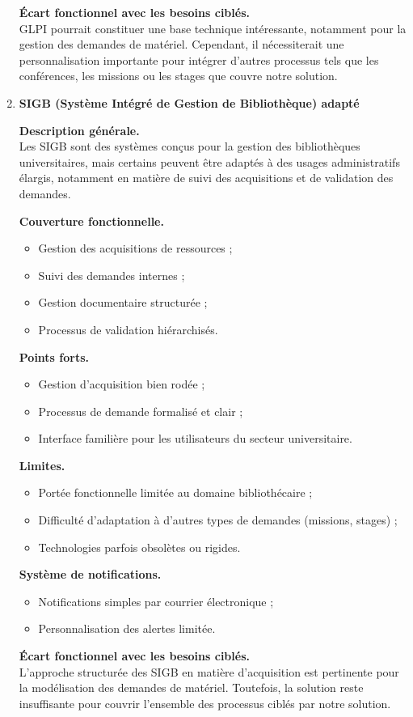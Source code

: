 \begin{enumerate}[label=\alph*)]
\textbf{Écart fonctionnel avec les besoins ciblés.} \\
GLPI pourrait constituer une base technique intéressante, notamment pour la gestion des demandes de matériel. Cependant, il nécessiterait une personnalisation importante pour intégrer d'autres processus tels que les conférences, les missions ou les stages que couvre notre solution.

\item \textbf{SIGB (Système Intégré de Gestion de Bibliothèque) adapté}

\textbf{Description générale.} \\
Les SIGB sont des systèmes conçus pour la gestion des bibliothèques universitaires, mais certains peuvent être adaptés à des usages administratifs élargis, notamment en matière de suivi des acquisitions et de validation des demandes.

\textbf{Couverture fonctionnelle.}
\begin{itemize}
\item Gestion des acquisitions de ressources ;
\item Suivi des demandes internes ;
\item Gestion documentaire structurée ;
\item Processus de validation hiérarchisés.
\end{itemize}

\textbf{Points forts.}
\begin{itemize}
\item Gestion d'acquisition bien rodée ;
\item Processus de demande formalisé et clair ;
\item Interface familière pour les utilisateurs du secteur universitaire.
\end{itemize}

\textbf{Limites.}
\begin{itemize}
\item Portée fonctionnelle limitée au domaine bibliothécaire ;
\item Difficulté d'adaptation à d'autres types de demandes (missions, stages) ;
\item Technologies parfois obsolètes ou rigides.
\end{itemize}

\textbf{Système de notifications.}
\begin{itemize}
\item Notifications simples par courrier électronique ;
\item Personnalisation des alertes limitée.
\end{itemize}

\textbf{Écart fonctionnel avec les besoins ciblés.} \\
L'approche structurée des SIGB en matière d'acquisition est pertinente pour la modélisation des demandes de matériel. Toutefois, la solution reste insuffisante pour couvrir l'ensemble des processus ciblés par notre solution.


\end{enumerate}

